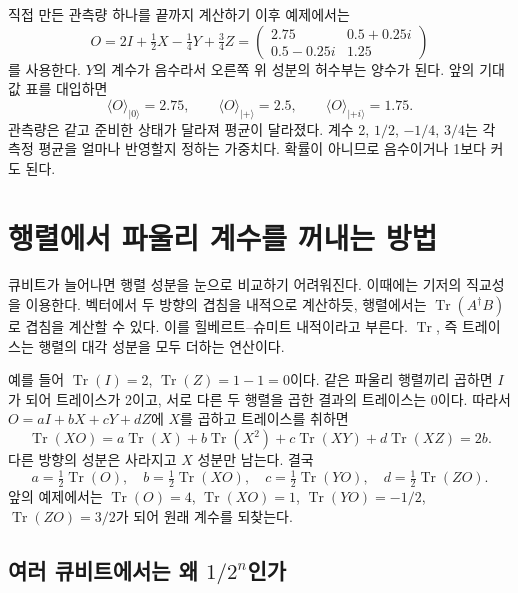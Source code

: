 
\begin{examplebox}{직접 만든 관측량 하나를 끝까지 계산하기}
이후 예제에서는
\[
O=2I+\tfrac12X-\tfrac14Y+\tfrac34Z
 =\begin{pmatrix}2.75&0.5+0.25i\\0.5-0.25i&1.25\end{pmatrix}
\]
를 사용한다. \(Y\)의 계수가 음수라서 오른쪽 위 성분의 허수부는 양수가 된다.
앞의 기대값 표를 대입하면
\[
\langle O\rangle_{\lvert0\rangle}=2.75,\qquad
\langle O\rangle_{\lvert+\rangle}=2.5,\qquad
\langle O\rangle_{\lvert+i\rangle}=1.75.
\]
관측량은 같고 준비한 상태가 달라져 평균이 달라졌다.
계수 2, \(1/2\), \(-1/4\), \(3/4\)는 각 측정 평균을 얼마나 반영할지 정하는 가중치다.
확률이 아니므로 음수이거나 1보다 커도 된다.
\end{examplebox}

\section{행렬에서 파울리 계수를 꺼내는 방법}

큐비트가 늘어나면 행렬 성분을 눈으로 비교하기 어려워진다.
이때에는 기저의 직교성을 이용한다. 벡터에서 두 방향의 겹침을 내적으로 계산하듯,
행렬에서는 \(\operatorname{Tr}(A^\dagger B)\)로 겹침을 계산할 수 있다.
이를 힐베르트--슈미트 내적이라고 부른다.
\(\operatorname{Tr}\), 즉 트레이스는 행렬의 대각 성분을 모두 더하는 연산이다.

예를 들어 \(\operatorname{Tr}(I)=2\), \(\operatorname{Tr}(Z)=1-1=0\)이다.
같은 파울리 행렬끼리 곱하면 \(I\)가 되어 트레이스가 2이고,
서로 다른 두 행렬을 곱한 결과의 트레이스는 0이다.
따라서 \(O=aI+bX+cY+dZ\)에 \(X\)를 곱하고 트레이스를 취하면
\[
\operatorname{Tr}(XO)
=a\operatorname{Tr}(X)+b\operatorname{Tr}(X^2)
+c\operatorname{Tr}(XY)+d\operatorname{Tr}(XZ)=2b.
\]
다른 방향의 성분은 사라지고 \(X\) 성분만 남는다. 결국
\[
a=\tfrac12\operatorname{Tr}(O),\quad
b=\tfrac12\operatorname{Tr}(XO),\quad
c=\tfrac12\operatorname{Tr}(YO),\quad
d=\tfrac12\operatorname{Tr}(ZO).
\]
앞의 예제에서는 \(\operatorname{Tr}(O)=4\),
\(\operatorname{Tr}(XO)=1\), \(\operatorname{Tr}(YO)=-1/2\),
\(\operatorname{Tr}(ZO)=3/2\)가 되어 원래 계수를 되찾는다.

\subsection{여러 큐비트에서는 왜 \texorpdfstring{\(1/2^n\)}{1/(2의 n제곱)}인가}

